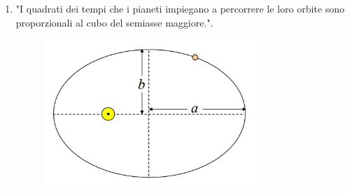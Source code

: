 \documentclass[a4paper,11pt]{article}
\begin{document}
\begin{enumerate}
\begin{figure}[h!!]
                \label{fig:2k}
            \end{figure}
            \\
            \newpage
            \item "I quadrati dei tempi che i pianeti impiegano a percorrere le loro orbite sono proporzionali al cubo del semiasse maggiore.".
            \\
            \begin{figure}[h!!]
                \centering
                    \includegraphics[width=8cm]{2dic/3LeggeKeplero.jpg}
                    \caption{}
                \label{fig:3k}
            \end{figure}
            \\
        \end{enumerate}
\end{document}
